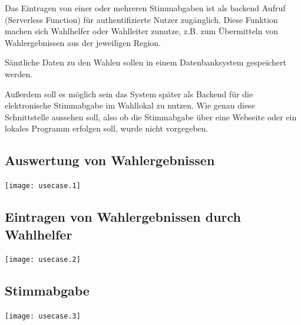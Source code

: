 \documentclass[a4paper,12pt]{article}
\begin{document}
Das Eintragen von einer oder mehreren Stimmabgaben ist als backend Aufruf (Serverless Function)
für authentifizierte Nutzer zugänglich. Diese Funktion machen sich Wahlhelfer oder Wahlleiter zunutze,
z.B. zum Übermitteln von Wahlergebnissen aus der jeweiligen Region.

Sämtliche Daten zu den Wahlen sollen in einem Datenbanksystem gespeichert werden.

Außerdem soll es möglich sein das System später als Backend für die elektronische Stimmabgabe im Wahllokal zu nutzen. Wie genau diese Schnittstelle aussehen soll, also ob die Stimmabgabe über eine Webseite oder ein lokales Programm erfolgen soll, wurde nicht vorgegeben.
 

\subsection{Auswertung von Wahlergebnissen}
\begin{center}
  \texttt{[image: usecase.1]}
\end{center}

\subsection{Eintragen von Wahlergebnissen durch Wahlhelfer}
\begin{center}
  \texttt{[image: usecase.2]}
\end{center}

\subsection{Stimmabgabe}
\begin{center}
  \texttt{[image: usecase.3]}
\end{center}
\end{document}
